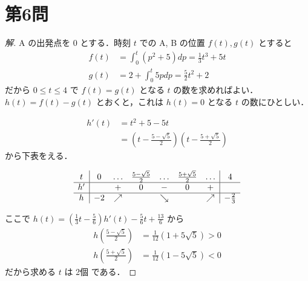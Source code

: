\documentclass[../main.tex]{subfiles}
\begin{document}
\newpage

\section*{第6問}

\begin{proof}[解]
  A の出発点を $0$ とする．時刻 $t$ での A, B の位置 $f(t), g(t)$ とすると
  \begin{align*}
    f(t) &= \int_0^t (p^2 + 5) dp = \frac{1}{3} t^3 + 5t \\
    g(t) &= 2 + \int_0^t 5p dp = \frac{5}{2} t^2 + 2
  \end{align*}
  だから $0 \le t \le 4$ で $f(t) = g(t)$ となる $t$ の数を求めればよい．
  $h(t) = f(t) - g(t)$ とおくと，これは $h(t) = 0$ となる $t$ の数にひとしい．

  \begin{align*}
    h'(t) &= t^2 + 5 - 5t \\
    &= \left(t - \frac{5-\sqrt{5}}{2}\right)\left(t - \frac{5+\sqrt{5}}{2}\right)
  \end{align*}
  から下表をえる．

  \[
    \begin{array}{c|c*5{c}|c}
      t & 0 & \dots & \frac{5-\sqrt{5}}{2} & \dots & \frac{5+\sqrt{5}}{2} & \dots & 4 \\ \hline
      h' & & + & 0 & - & 0 & + & \\ \hline
      h & -2 & \nearrow & & \searrow & & \nearrow & -\frac{2}{3}
    \end{array}
  \]

  ここで $h(t) = \left(\frac{1}{3}t - \frac{5}{6}\right) h'(t) - \frac{5}{6}t + \frac{13}{6}$ から
  \begin{align*}
    h\left(\frac{5-\sqrt{5}}{2}\right) &= \frac{1}{12}(1 + 5\sqrt{5}) > 0 \\
    h\left(\frac{5+\sqrt{5}}{2}\right) &= \frac{1}{12}(1 - 5\sqrt{5}) < 0
  \end{align*}
  だから求める $t$ は 2個 である．
\end{proof}
\end{document}
